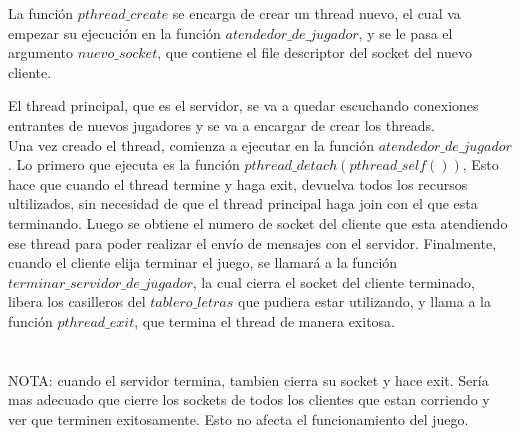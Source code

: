 La función $pthread\_create$ se encarga de crear un thread nuevo, el cual va empezar su ejecución en la función $atendedor\_de\_jugador$, y se le pasa el argumento
$nuevo\_socket$, que contiene el file descriptor del socket del nuevo cliente.

El thread principal, que es el servidor, se va a quedar escuchando conexiones entrantes de nuevos jugadores y se va a encargar de crear los threads. 
\\
Una vez creado el thread, comienza a ejecutar en la función $atendedor\_de\_jugador$. Lo primero que ejecuta es la función $pthread\_detach(pthread\_self())$, 
Esto hace que cuando el thread termine y haga exit, devuelva todos los recursos ultilizados, sin necesidad de que el thread principal haga join con el que
esta terminando.
Luego se obtiene el numero de socket del cliente que esta atendiendo ese thread para poder realizar el envío de mensajes con el servidor.
Finalmente, cuando el cliente elija terminar el juego, se llamará a la función $terminar\_servidor\_de\_jugador$, la cual cierra el socket del cliente terminado,
libera los casilleros del $tablero\_letras$ que pudiera estar utilizando, y llama a la función $pthread\_exit$, que termina el thread de manera exitosa.
\\ 
\\
\\
NOTA: cuando el servidor termina, tambien cierra su socket y hace exit. Sería mas adecuado que cierre los sockets de todos los clientes que estan corriendo
y ver que terminen exitosamente. Esto no afecta el funcionamiento del juego.



